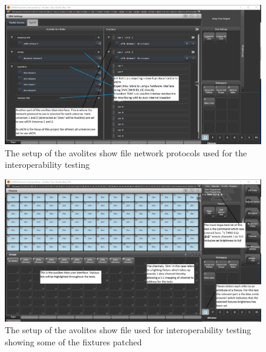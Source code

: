 \documentclass[11pt,a4paper]{article}
\begin{document}
\begin{figure}[H]
	\begin{turn}{90}
		\begin{minipage}[c][\textwidth][c]{\textheight}
			\centering
			\includegraphics*[width=\textwidth]{avo-dmx-lines.png}
			\caption{The setup of the avolites show file network protocols used for the interoperability testing}
			\label{AVO_DMX_LINES}
		\end{minipage}
	\end{turn}
\end{figure}

\begin{figure}[H]
	\begin{turn}{90}
		\begin{minipage}[c][\textwidth][c]{\textheight}
			\centering
			\includegraphics*[width=\textwidth]{avo-file-dims.png}
			\caption{The setup of the avolites show file used for interoperability testing showing some of the fixtures patched}
			\label{AVO_RECV_INTEROP_SETUP}
		\end{minipage}
	\end{turn}
\end{figure}
\end{document}
